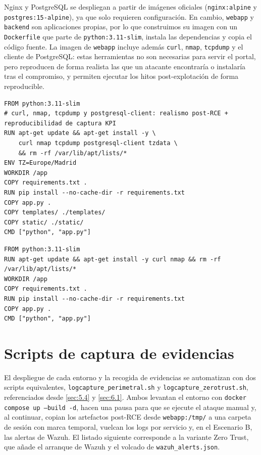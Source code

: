 \documentclass[11pt,spanish,listoffigures,listoftables]{tfgetsinf}
\begin{document}
Nginx y PostgreSQL se despliegan a partir de imágenes oficiales (\texttt{nginx:alpine} y \texttt{postgres:15-alpine}), ya que solo requieren configuración. En cambio, \texttt{webapp} y \texttt{backend} son aplicaciones propias, por lo que construimos su imagen con un \texttt{Dockerfile} que parte de \texttt{python:3.11-slim}, instala las dependencias y copia el código fuente. La imagen de \texttt{webapp} incluye además \texttt{curl}, \texttt{nmap}, \texttt{tcpdump} y el cliente de PostgreSQL: estas herramientas no son necesarias para servir el portal, pero reproducen de forma realista las que un atacante encontraría o instalaría tras el compromiso, y permiten ejecutar los hitos post-explotación de forma reproducible.

\begin{lstlisting}[basicstyle=\ttfamily\footnotesize,breaklines=true,caption={Dockerfile de \texttt{webapp}},captionpos=b]
FROM python:3.11-slim
# curl, nmap, tcpdump y postgresql-client: realismo post-RCE + reproducibilidad de captura KPI
RUN apt-get update && apt-get install -y \
    curl nmap tcpdump postgresql-client tzdata \
    && rm -rf /var/lib/apt/lists/*
ENV TZ=Europe/Madrid
WORKDIR /app
COPY requirements.txt .
RUN pip install --no-cache-dir -r requirements.txt
COPY app.py .
COPY templates/ ./templates/
COPY static/ ./static/
CMD ["python", "app.py"]
\end{lstlisting}

\begin{lstlisting}[basicstyle=\ttfamily\footnotesize,breaklines=true,caption={Dockerfile de \texttt{backend}},captionpos=b]
FROM python:3.11-slim
RUN apt-get update && apt-get install -y curl nmap && rm -rf /var/lib/apt/lists/*
WORKDIR /app
COPY requirements.txt .
RUN pip install --no-cache-dir -r requirements.txt
COPY app.py .
CMD ["python", "app.py"]
\end{lstlisting}

\section{Scripts de captura de evidencias}

El despliegue de cada entorno y la recogida de evidencias se automatizan con dos scripts equivalentes, \texttt{logcapture\_perimetral.sh} y \texttt{logcapture\_zerotrust.sh}, referenciados desde \cref{sec:5.4} y \cref{sec:6.1}. Ambos levantan el entorno con \texttt{docker compose up --build -d}, hacen una pausa para que se ejecute el ataque manual y, al continuar, copian los artefactos post-RCE desde \texttt{webapp:/tmp/} a una carpeta de sesión con marca temporal, vuelcan los logs por servicio y, en el Escenario B, las alertas de Wazuh. El listado siguiente corresponde a la variante Zero Trust, que añade el arranque de Wazuh y el volcado de \texttt{wazuh\_alerts.json}.
\end{document}
